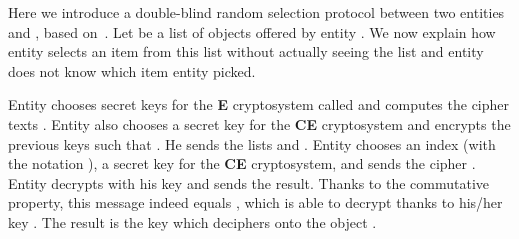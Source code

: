 \documentclass{article}
\begin{document}
Here we introduce a double-blind random selection protocol between two entities  and , based on~\cite{bao_icisc_00}. 
Let  be a list of  objects offered by
entity . We now explain how entity 
selects an item from this list without actually seeing the list and
entity  does not know which item entity  picked.

Entity  chooses  secret keys for the \textbf{E} cryptosystem
called  and computes the cipher texts
.  {Entity}  also chooses a secret key
 for the \textbf{CE} cryptosystem and encrypts the previous keys such that
.  He sends  the lists
 and
.  {Entity}  chooses an index
 (with the notation ), a secret key 
for the \textbf{CE} cryptosystem, and sends  the cipher
.  Entity  decrypts  with his key 
and sends  the result. Thanks to the commutative property,
this message indeed equals , which 
is able to decrypt thanks to his/her key . The result is the key
 which deciphers  onto the object .
\end{document}
